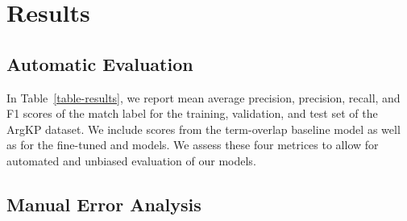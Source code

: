 \section{Results}\label{results}


\subsection{Automatic Evaluation}

In Table~\ref{table-results}, we report mean average precision, precision, recall, and F1 scores of the match label for the training, validation, and test set of the ArgKP dataset. We include scores from the term-overlap baseline model as well as for the fine-tuned \BertBase and \RobertaBase models.
We assess these four metrices to allow for automated and unbiased evaluation of our models.


\subsection{Manual Error Analysis}

